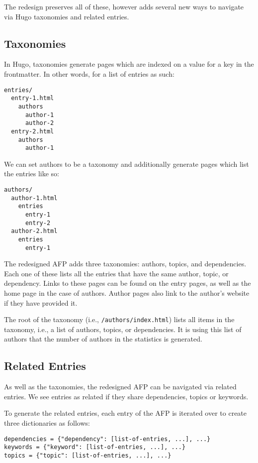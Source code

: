 \documentclass[bsc,frontabs,oneside,singlespacing,parskip,deptreport,logo]{infthesis}
\begin{document}
\cbstart
The redesign preserves all of these, however adds several new ways to navigate via Hugo taxonomies and related entries.

\subsection{Taxonomies}

In Hugo, taxonomies generate pages which are indexed on a value for a key in the frontmatter. In other words, for a list of entries as such:

{\footnotesize
\begin{verbatim}
entries/
  entry-1.html
    authors
      author-1
      author-2
  entry-2.html
    authors
      author-1
\end{verbatim}
}

We can set authors to be a taxonomy and additionally generate pages which list the entries like so:

{\footnotesize
\begin{verbatim}
authors/
  author-1.html
    entries
      entry-1
      entry-2
  author-2.html
    entries
      entry-1
\end{verbatim}
}

The redesigned AFP adds three taxonomies: authors, topics, and dependencies. Each one of these lists all the entries that have the same author, topic, or dependency. Links to these pages can be found on the entry pages, as well as the home page in the case of authors. Author pages also link to the author's website if they have provided it.

The root of the taxonomy (i.e., \texttt{/authors/index.html}) lists all items in the taxonomy, i.e., a list of authors, topics, or dependencies. It is using this list of authors that the number of authors in the statistics is generated.

\subsection{Related Entries} \label{sec:related-entries}

As well as the taxonomies, the redesigned AFP can be navigated via related entries. We see entries as related if they share dependencies, topics or keywords.

To generate the related entries, each entry of the AFP is iterated over to create three dictionaries as follows: 

{\footnotesize
\begin{verbatim}
dependencies = {"dependency": [list-of-entries, ...], ...}
keywords = {"keyword": [list-of-entries, ...], ...}
topics = {"topic": [list-of-entries, ...], ...}
\end{verbatim}
}
\end{document}
